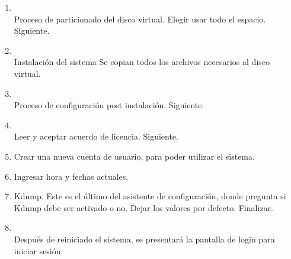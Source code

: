 \documentclass[11pt]{article}
\begin{document}
\begin{enumerate}
		    \item 
		    	\begin{minipage}[t]{\linewidth}
			        \raggedright
			        \medskip
			        \\Proceso de particionado del disco virtual. Elegir usar todo el espacio. Siguiente. 
		        \end{minipage}

		    \item 
		    	\begin{minipage}[t]{\linewidth}
			        \raggedright
			        \medskip
			        \\Instalación del sistema Se copian todos los archivos necesarios al disco virtual. 
		        \end{minipage}

		    \item
		    	\begin{minipage}[t]{\linewidth}
			        \raggedright
			        \medskip
			        \\Proceso de configuración post instalación. Siguiente. 
		        \end{minipage}

		    \item 
		    	\begin{minipage}[t]{\linewidth}
			        \raggedright
			        \medskip
			        \\Leer y aceptar acuerdo de licencia. Siguiente. 
		        \end{minipage}

		    \item Crear una nueva cuenta de usuario, para poder utilizar el sistema.
		    \item Ingresar hora y fechas actuales.
		    \item Kdump. Este es el último del asistente de configuración, donde pregunta si Kdump debe ser activado o no. Dejar los valores por defecto. Finalizar.

		    \item
		    	\begin{minipage}[t]{\linewidth}
			        \raggedright
			        \medskip
			        \\Después de reiniciado el sistema, se presentará la pantalla de login para iniciar sesión. 
		        \end{minipage}


\end{enumerate}
\end{document}
